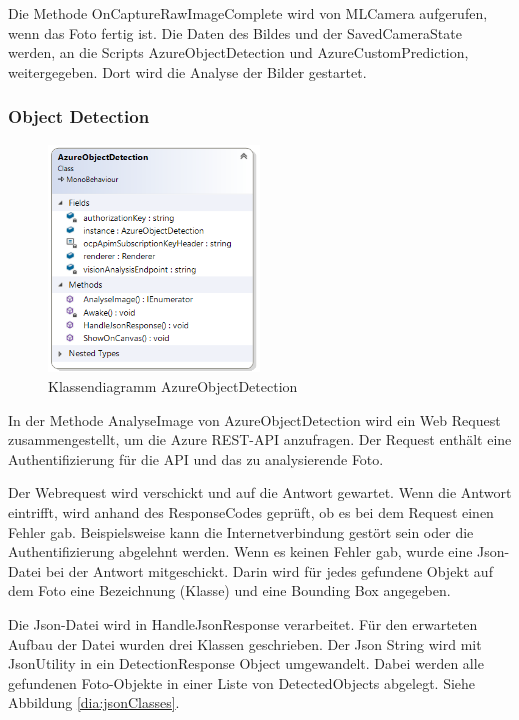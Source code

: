 Die Methode OnCaptureRawImageComplete wird von MLCamera aufgerufen, wenn das Foto fertig ist. Die Daten des Bildes und der SavedCameraState werden, an die Scripts AzureObjectDetection und AzureCustomPrediction, weitergegeben. Dort wird die Analyse der Bilder gestartet. 

\subsubsection{Object Detection}

\begin{figure}[H]
	\centering
	\includegraphics[width=0.5\textwidth]{images/dia_azureobjectdetection.PNG}
	\caption[]{Klassendiagramm AzureObjectDetection}
	\label{dia:azureobjectdetection}
\end{figure}

In der Methode AnalyseImage von AzureObjectDetection wird ein Web Request zusammengestellt, um die Azure REST-API anzufragen. Der Request enthält eine Authentifizierung für die API und das zu analysierende Foto. %

Der Webrequest wird verschickt und auf die Antwort gewartet. Wenn die Antwort eintrifft, wird anhand des ResponseCodes geprüft, ob es bei dem Request einen Fehler gab. Beispielsweise kann die Internetverbindung gestört sein oder die Authentifizierung abgelehnt werden.
Wenn es keinen Fehler gab, wurde eine Json-Datei bei der Antwort mitgeschickt. Darin wird für jedes gefundene Objekt auf dem Foto eine Bezeichnung (Klasse) und eine Bounding Box angegeben. 

Die Json-Datei wird in HandleJsonResponse verarbeitet. Für den erwarteten Aufbau der Datei wurden drei Klassen geschrieben. Der Json String wird mit JsonUtility in ein DetectionResponse Object umgewandelt. Dabei werden alle gefundenen Foto-Objekte in einer Liste von DetectedObjects abgelegt. Siehe Abbildung \ref{dia:jsonClasses}. \citep{fromjson}

